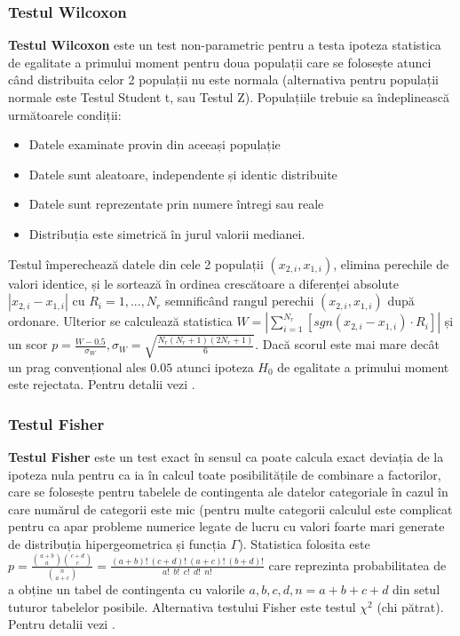 \documentclass[12pt,draft]{article}
\begin{document}
\subsubsection{Testul Wilcoxon}
 \textbf{Testul Wilcoxon} este un test non-parametric pentru a testa ipoteza statistica de egalitate a primului moment pentru doua populații care se folosește atunci când distribuita celor 2 populații nu este normala (alternativa pentru populații normale este Testul Student t, sau Testul Z). 
 Populațiile trebuie sa îndeplinească următoarele condiții:
 \begin{itemize}
  \item Datele examinate provin din aceeași populație
  \item Datele sunt aleatoare, independente și identic distribuite
  \item Datele sunt reprezentate prin numere întregi sau reale
  \item Distribuția este simetrică în jurul valorii medianei.
 \end{itemize}
  Testul împerechează datele din cele 2 populații $(x_{2,i},x_{1,i})$, elimina perechile de valori identice, și le sortează în ordinea crescătoare a diferenței absolute $|x_{2,i}-x_{1,i}|$ cu $R_i=1, ..., N_r$ semnificând rangul perechii $(x_{2,i},x_{1,i})$ după ordonare. 
  Ulterior se calculează statistica $W = |\sum_{i=1}^{N_r} [sgn(x_{2,i} - x_{1,i}) \cdot R_i]| $ și un scor $p = \frac{W - 0.5}{\sigma_W}, \sigma_W = \sqrt{\frac{N_r(N_r + 1)(2N_r + 1)}{6}}$. 
  Dacă scorul este mai mare decât un prag convențional ales $0.05$ atunci ipoteza $H_0$ de egalitate a primului moment este rejectata. 
  Pentru detalii vezi \citep{wilcoxon45,siegel56}.

\subsubsection{Testul Fisher}
 \label{testFisher}
 \textbf{Testul Fisher} este un test exact în sensul ca poate calcula exact deviația de la ipoteza nula pentru ca ia în calcul toate posibilitățile de combinare a factorilor, care se folosește pentru tabelele de contingenta ale datelor categoriale în cazul în care numărul de categorii este mic (pentru multe categorii calculul este complicat pentru ca apar probleme numerice legate de lucru cu valori foarte mari generate de distribuția hipergeometrica și funcția $\Gamma$). Statistica folosita este $p = \frac{ \displaystyle{{a+b}\choose{a}} \displaystyle{{c+d}\choose{c}} }{ \displaystyle{{n}\choose{a+c}} } = \frac{(a+b)!~(c+d)!~(a+c)!~(b+d)!}{a!~~b!~~c!~~d!~~n!}$ care reprezinta probabilitatea de a obține un tabel de contingenta cu valorile $a, b, c, d, n=a+b+c+d$ din setul tuturor tabelelor posibile. Alternativa testului Fisher este testul $\chi^2$ (chi pătrat). Pentru detalii vezi \citep{fisher1922interpretation}.
\end{document}
